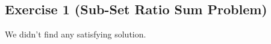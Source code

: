 \subsection*{Exercise 1 \mdseries (Sub-Set Ratio Sum Problem)}

We didn't find any satisfying solution.
